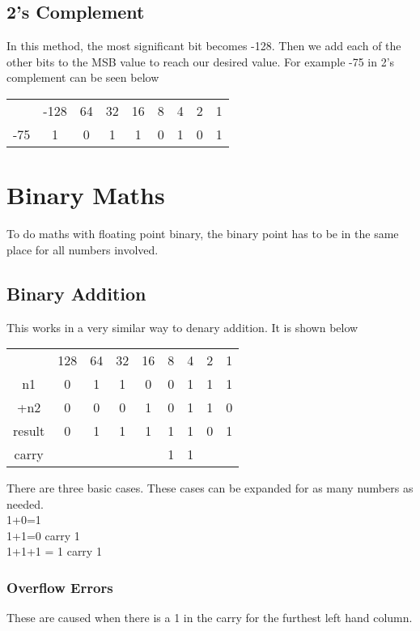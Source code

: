 \documentclass[a4paper,11pt, twocolumn]{article}
\begin{document}
\subsection{2's Complement}
In this method, the most significant bit becomes -128. Then we add each of the other bits to the MSB value to reach our desired value. For example -75 in 2's complement can be seen below
\begin{table}[H]
    \centering
    \begin{tabularx}{0.9\linewidth}{c | c c c c c c c c}
         & -128 & 64 & 32 & 16 & 8 & 4 & 2 & 1 \\
        -75 & 1 & 0 & 1 & 1 & 0 & 1 & 0 & 1
    \end{tabularx}
\end{table}

\section{Binary Maths}
To do maths with floating point binary, the binary point has to be in the same place for all numbers involved.
\subsection{Binary Addition}
This works in a very similar way to denary addition.
It is shown below
\begin{table}[H]
    \centering
    \begin{tabularx}{0.9\linewidth}{c | c c c c c c c c}
         & 128 & 64 & 32 & 16 & 8 & 4 & 2 & 1 \\
         n1 & 0 & 1 & 1 & 0 & 0 & 1 & 1 & 1 \\
        +n2 & 0 & 0 & 0 & 1 & 0 & 1 & 1 & 0 \\
        \hline
        result & 0 & 1 & 1 & 1 & 1 & 1 & 0 & 1 \\
        \hline
        carry &  &  &  &  & 1 & 1 &  & 
    \end{tabularx}
\end{table}
\noindent There are three basic cases. These cases can be expanded for as many numbers as needed.\\
1+0=1\\
1+1=0 carry 1\\
1+1+1 = 1 carry 1
\subsubsection{Overflow Errors}
These are caused when there is a 1 in the carry for the furthest left hand column. 
\end{document}
